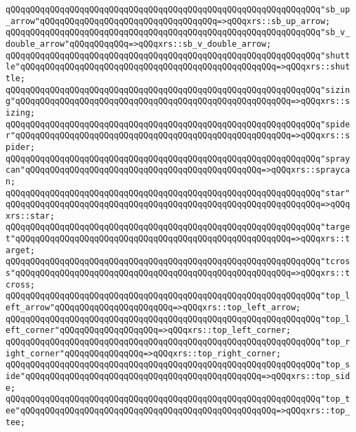 \verb|qQQqqQQqqQQqqQQqqQQqqQQqqQQqqQQqqQQqqQQqqQQqqQQqqQQqqQQqqQQqqQQq"sb_up_arrow"qQQqqQQqqQQqqQQqqQQqqQQqqQQqqQQqqQQq=>qQQqxrs::sb_up_arrow;|\newline
\verb|qQQqqQQqqQQqqQQqqQQqqQQqqQQqqQQqqQQqqQQqqQQqqQQqqQQqqQQqqQQqqQQq"sb_v_double_arrow"qQQqqQQqqQQq=>qQQqxrs::sb_v_double_arrow;|\newline
\verb|qQQqqQQqqQQqqQQqqQQqqQQqqQQqqQQqqQQqqQQqqQQqqQQqqQQqqQQqqQQqqQQq"shuttle"qQQqqQQqqQQqqQQqqQQqqQQqqQQqqQQqqQQqqQQqqQQqqQQqqQQq=>qQQqxrs::shuttle;|\newline
\verb|qQQqqQQqqQQqqQQqqQQqqQQqqQQqqQQqqQQqqQQqqQQqqQQqqQQqqQQqqQQqqQQq"sizing"qQQqqQQqqQQqqQQqqQQqqQQqqQQqqQQqqQQqqQQqqQQqqQQqqQQqqQQq=>qQQqxrs::sizing;|\newline
\verb|qQQqqQQqqQQqqQQqqQQqqQQqqQQqqQQqqQQqqQQqqQQqqQQqqQQqqQQqqQQqqQQq"spider"qQQqqQQqqQQqqQQqqQQqqQQqqQQqqQQqqQQqqQQqqQQqqQQqqQQqqQQq=>qQQqxrs::spider;|\newline
\verb|qQQqqQQqqQQqqQQqqQQqqQQqqQQqqQQqqQQqqQQqqQQqqQQqqQQqqQQqqQQqqQQq"spraycan"qQQqqQQqqQQqqQQqqQQqqQQqqQQqqQQqqQQqqQQqqQQqqQQq=>qQQqxrs::spraycan;|\newline
\verb|qQQqqQQqqQQqqQQqqQQqqQQqqQQqqQQqqQQqqQQqqQQqqQQqqQQqqQQqqQQqqQQq"star"qQQqqQQqqQQqqQQqqQQqqQQqqQQqqQQqqQQqqQQqqQQqqQQqqQQqqQQqqQQqqQQq=>qQQqxrs::star;|\newline
\verb|qQQqqQQqqQQqqQQqqQQqqQQqqQQqqQQqqQQqqQQqqQQqqQQqqQQqqQQqqQQqqQQq"target"qQQqqQQqqQQqqQQqqQQqqQQqqQQqqQQqqQQqqQQqqQQqqQQqqQQqqQQq=>qQQqxrs::target;|\newline
\verb|qQQqqQQqqQQqqQQqqQQqqQQqqQQqqQQqqQQqqQQqqQQqqQQqqQQqqQQqqQQqqQQq"tcross"qQQqqQQqqQQqqQQqqQQqqQQqqQQqqQQqqQQqqQQqqQQqqQQqqQQqqQQq=>qQQqxrs::tcross;|\newline
\verb|qQQqqQQqqQQqqQQqqQQqqQQqqQQqqQQqqQQqqQQqqQQqqQQqqQQqqQQqqQQqqQQq"top_left_arrow"qQQqqQQqqQQqqQQqqQQqqQQq=>qQQqxrs::top_left_arrow;|\newline
\verb|qQQqqQQqqQQqqQQqqQQqqQQqqQQqqQQqqQQqqQQqqQQqqQQqqQQqqQQqqQQqqQQq"top_left_corner"qQQqqQQqqQQqqQQqqQQq=>qQQqxrs::top_left_corner;|\newline
\verb|qQQqqQQqqQQqqQQqqQQqqQQqqQQqqQQqqQQqqQQqqQQqqQQqqQQqqQQqqQQqqQQq"top_right_corner"qQQqqQQqqQQqqQQq=>qQQqxrs::top_right_corner;|\newline
\verb|qQQqqQQqqQQqqQQqqQQqqQQqqQQqqQQqqQQqqQQqqQQqqQQqqQQqqQQqqQQqqQQq"top_side"qQQqqQQqqQQqqQQqqQQqqQQqqQQqqQQqqQQqqQQqqQQqqQQq=>qQQqxrs::top_side;|\newline
\verb|qQQqqQQqqQQqqQQqqQQqqQQqqQQqqQQqqQQqqQQqqQQqqQQqqQQqqQQqqQQqqQQq"top_tee"qQQqqQQqqQQqqQQqqQQqqQQqqQQqqQQqqQQqqQQqqQQqqQQqqQQq=>qQQqxrs::top_tee;|\newline
